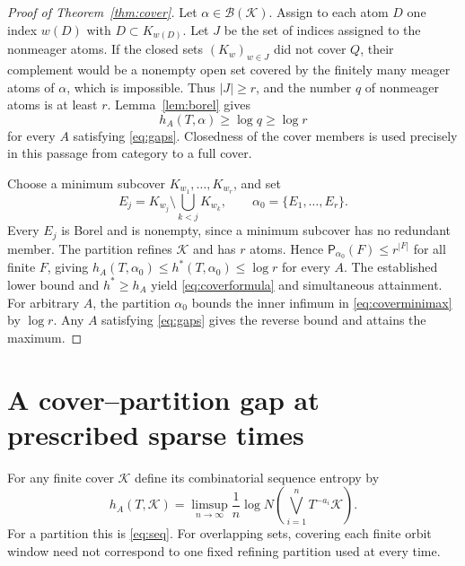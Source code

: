 \documentclass[11pt,reqno]{amsart}
\numberwithin{equation}{section}
\theoremstyle{definition}
\theoremstyle{remark}
\newcommand{\K}{\mathcal K}
\newcommand{\Patt}{\mathsf P}
\newcommand{\hpat}{h^{*}}
\begin{document}
\begin{proof}[Proof of Theorem~\ref{thm:cover}]
Let $\alpha\in\mathcal B(\K)$. Assign to each atom $D$ one index
$w(D)$ with $D\subset K_{w(D)}$. Let $J$ be the set of indices assigned
to the nonmeager atoms. If the closed sets $(K_w)_{w\in J}$ did not
cover $Q$, their complement would be a nonempty open set covered by
the finitely many meager atoms of $\alpha$, which is impossible.
Thus $|J|\ge r$, and the number $q$ of nonmeager atoms is at least $r$.
Lemma~\ref{lem:borel} gives
\[
 h_A(T,\alpha)\ge\log q\ge\log r
\]
for every $A$ satisfying \eqref{eq:gaps}. Closedness of the cover
members is used precisely in this passage from category to a full cover.

Choose a minimum subcover $K_{w_1},\ldots,K_{w_r}$, and set
\begin{equation}\label{eq:ordered}
 E_j=K_{w_j}\setminus\bigcup_{k<j}K_{w_k},\qquad
 \alpha_0=\{E_1,\ldots,E_r\}.
\end{equation}
Every $E_j$ is Borel and is nonempty, since a minimum subcover has no
redundant member. The partition refines $\K$ and has $r$ atoms. Hence
$\Patt_{\alpha_0}(F)\le r^{|F|}$ for all finite $F$, giving
$h_A(T,\alpha_0)\le\hpat(T,\alpha_0)\le\log r$ for every $A$.
The established lower bound and $\hpat\ge h_A$ yield
\eqref{eq:coverformula} and simultaneous attainment.
For arbitrary $A$, the partition $\alpha_0$ bounds the inner infimum
in \eqref{eq:coverminimax} by $\log r$. Any $A$ satisfying
\eqref{eq:gaps} gives the reverse bound and attains the maximum.
\end{proof}

\section{A cover--partition gap at prescribed sparse times}

For any finite cover $\K$ define its combinatorial sequence entropy by
\[
 h_A(T,\K)=\limsup_{n\to\infty}\frac1n
 \log N\left(\bigvee_{i=1}^n T^{-a_i}\K\right).
\]
For a partition this is \eqref{eq:seq}. For overlapping sets, covering
each finite orbit window need not correspond to one fixed refining
partition used at every time.
\end{document}
